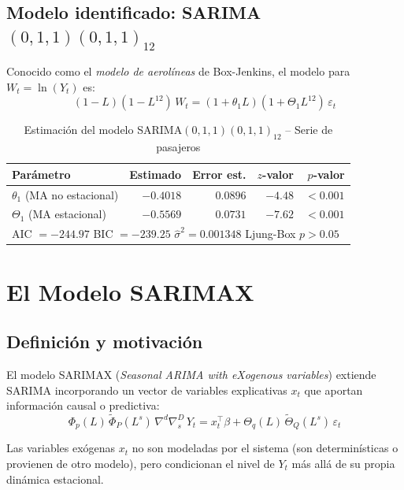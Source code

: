 \documentclass[12pt, a4paper]{article}
\begin{document}
\subsection{Modelo identificado: SARIMA$(0,1,1)(0,1,1)_{12}$}

Conocido como el \emph{modelo de aerolíneas} de Box-Jenkins, el modelo para
$W_t = \ln(Y_t)$ es:
\[
  (1-L)(1-L^{12})\,W_t = (1+\theta_1 L)(1+\Theta_1 L^{12})\,\varepsilon_t
\]

\begin{table}[H]
  \centering
  \caption{Estimación del modelo SARIMA$(0,1,1)(0,1,1)_{12}$ -- Serie de pasajeros}
  \label{tab:estimacion}
  \begin{tabular}{lrrrr}
    \toprule
    \textbf{Parámetro} & \textbf{Estimado} & \textbf{Error est.} & \textbf{$z$-valor} & \textbf{$p$-valor} \\
    \midrule
    $\theta_1$ (MA no estacional) & $-0.4018$ & $0.0896$ & $-4.48$ & $<0.001$ \\
    $\Theta_1$ (MA estacional)    & $-0.5569$ & $0.0731$ & $-7.62$ & $<0.001$ \\
    \midrule
    \multicolumn{5}{l}{AIC $= -244.97$ \quad BIC $= -239.25$ \quad
                        $\hat{\sigma}^2 = 0.001348$ \quad Ljung-Box $p > 0.05$} \\
    \bottomrule
  \end{tabular}
\end{table}

\section{El Modelo SARIMAX}

\subsection{Definición y motivación}

El modelo SARIMAX (\textit{Seasonal ARIMA with eXogenous variables}) extiende
SARIMA incorporando un vector de variables explicativas $x_t$ que aportan
información causal o predictiva:
\[
  \Phi_p(L)\,\tilde{\Phi}_P(L^s)\,\nabla^d\nabla_s^D\,Y_t
  = x_t^\top\beta + \Theta_q(L)\,\tilde{\Theta}_Q(L^s)\,\varepsilon_t
\]

Las variables exógenas $x_t$ no son modeladas por el sistema (son
determinísticas o provienen de otro modelo), pero condicionan el nivel de $Y_t$
más allá de su propia dinámica estacional.
\end{document}
